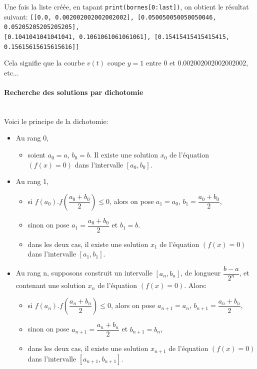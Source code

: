 Une fois la liste créée, en tapant \verb?print(bornes[0:last])?, on obtient le résultat suivant:
\verb?[[0.0, 0.002002002002002002], [0.050050050050050046, 0.05205205205205205],?\\
\verb?[0.1041041041041041, 0.1061061061061061], [0.15415415415415415, 0.15615615615615616]]?

Cela signifie que la courbe $v(t)$ coupe $y=1$ entre $0$ et $0.002002002002002002$, etc...



\paragraph{Recherche des solutions par dichotomie} ~\ \\

Voici le principe de la dichotomie:
\begin{itemize}
 \item Au rang 0,
 \begin{itemize}
  \item soient $a_0=a$, $b_0=b$. Il existe une solution $x_0$ de l'équation $(f(x)=0)$ dans l'intervalle $[a_0,b_0]$.
 \end{itemize}
 \item Au rang 1,
 \begin{itemize}
  \item si $f(a_0).f(\dfrac{a_0+b_0}{2})\leq 0$, alors on pose $a_1=a_0$, $b_1=\dfrac{a_0+b_0}{2}$,
  \item sinon on pose $a_{1}=\dfrac{a_0+b_0}{2}$ et $b_1=b$.
  \item dans les deux cas, il existe une solution $x_1$ de l'équation $(f(x)=0)$ dans l'intervalle $[a_1,b_1]$.
 \end{itemize}
 \item Au rang n, supposons construit un intervalle $[a_n,b_n]$, de longueur $\dfrac{b-a}{2^n}$,  et contenant une solution $x_n$ de l'équation $(f(x)=0)$. Alors:
 \begin{itemize}
  \item  si $f(a_n).f(\dfrac{a_n+b_n}{2})\leq 0$, alors on pose $a_{n+1}=a_n$, $b_{n+1}=\dfrac{a_n+b_n}{2}$,
  \item sinon on pose $a_{n+1}=\dfrac{a_n+b_n}{2}$ et $b_{n+1}=b_{n}$,
  \item dans les deux cas, il existe une solution $x_{n+1}$ de l'équation $(f(x)=0)$ dans l'intervalle $[a_{n+1},b_{n+1}]$.
 \end{itemize}
\end{itemize}

